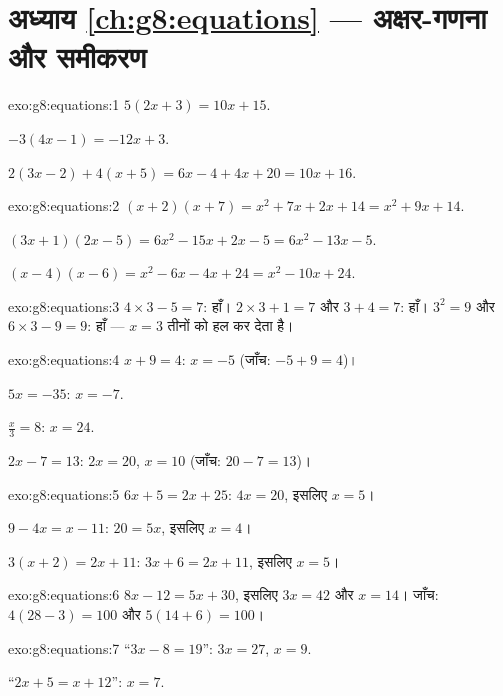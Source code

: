 \section*{अध्याय \ref{ch:g8:equations} --- अक्षर-गणना और समीकरण}

\begin{solution}{exo:g8:equations:1}
$5(2x + 3) = 10x + 15$.

$-3(4x - 1) = -12x + 3$.

$2(3x - 2) + 4(x + 5) = 6x - 4 + 4x + 20 = 10x + 16$.
\end{solution}

\begin{solution}{exo:g8:equations:2}
$(x+2)(x+7) = x^2 + 7x + 2x + 14 = x^2 + 9x + 14$.

$(3x+1)(2x-5) = 6x^2 - 15x + 2x - 5 = 6x^2 - 13x - 5$.

$(x-4)(x-6) = x^2 - 6x - 4x + 24 = x^2 - 10x + 24$.
\end{solution}

\begin{solution}{exo:g8:equations:3}
$4 \times 3 - 5 = 7$: हाँ। \quad
$2 \times 3 + 1 = 7$ और $3 + 4 = 7$: हाँ। \quad
$3^2 = 9$ और $6 \times 3 - 9 = 9$: हाँ --- $x = 3$ तीनों को हल कर
देता है।
\end{solution}

\begin{solution}{exo:g8:equations:4}
$x + 9 = 4$: $x = -5$ (जाँच: $-5 + 9 = 4$)।

$5x = -35$: $x = -7$.

$\frac x3 = 8$: $x = 24$.

$2x - 7 = 13$: $2x = 20$, $x = 10$ (जाँच: $20 - 7 = 13$)।
\end{solution}

\begin{solution}{exo:g8:equations:5}
$6x + 5 = 2x + 25$: $4x = 20$, इसलिए $x = 5$।

$9 - 4x = x - 11$: $20 = 5x$, इसलिए $x = 4$।

$3(x + 2) = 2x + 11$: $3x + 6 = 2x + 11$, इसलिए $x = 5$।
\end{solution}

\begin{solution}{exo:g8:equations:6}
$8x - 12 = 5x + 30$, इसलिए $3x = 42$ और $x = 14$। जाँच:
$4(28 - 3) = 100$ और $5(14 + 6) = 100$।
\end{solution}

\begin{solution}{exo:g8:equations:7}
``$3x - 8 = 19$'': $3x = 27$, $x = 9$.

``$2x + 5 = x + 12$'': $x = 7$.
\end{solution}

